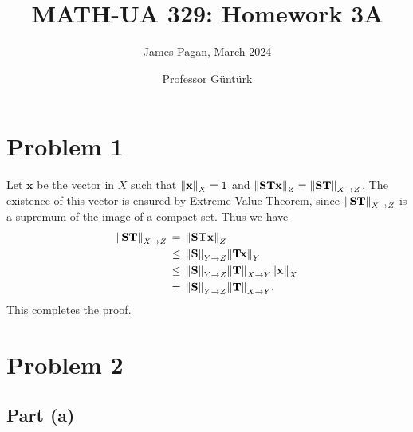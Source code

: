 \documentclass[11pt]{article}
\title{MATH-UA 329: Homework 3A}
\author{James Pagan, March 2024}
\date{Professor Güntürk}
\renewcommand{\vec}[1]{\mathbf{#1}}
\newcommand{\mat}[1]{\mathbf{#1}}
\begin{document}
\maketitle
\tableofcontents
\newpage


\section{Problem 1}
 
Let $\vec{x}$ be the vector in $X$ such that $\norm{\vec{x}}_{X} = 1$ and $\norm{\mat{ST} \vec{x}}_{Z} = \norm{\mat{ST}}_{X \to Z}$. The existence of this vector is ensured by Extreme Value Theorem, since $\norm{\mat{ST}}_{X \to Z}$ is a supremum of the image of a compact set. Thus we have
\begin{align*}
  \norm{\mat{ST}}_{X \to Z} \, & = \, \norm{\mat{ST} \vec{x}}_{Z} \\
                               & \le \, \norm{\mat{S}}_{Y \to Z} \norm{\mat{Tx}}_{Y} \\
                               & \le \, \norm{\mat{S}}_{Y \to Z} \norm{\mat{T}}_{X \to Y} \norm{\vec{x}}_{X} \\
                               & = \, \norm{\mat{S}}_{Y \to Z} \norm{\mat{T}}_{X \to Y}.
\end{align*}
This completes the proof.


\section{Problem 2}


\subsection{Part (a)}
\end{document}
